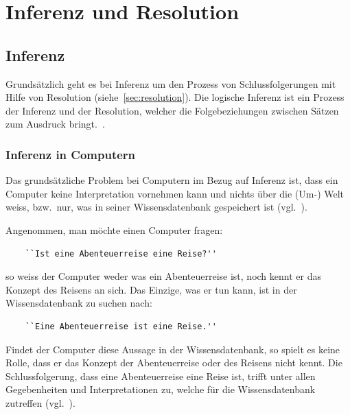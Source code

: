 \chapter{Inferenz und Resolution}
\label{chap:inferenz_resolution}

\section{Inferenz}
\label{sec:inferenz}
Grundsätzlich geht es bei Inferenz um den Prozess von Schlussfolgerungen mit Hilfe von Resolution (siehe~\ref{sec:resolution}). Die logische Inferenz ist ein Prozess der Inferenz und der Resolution, welcher die Folgebeziehungen zwischen Sätzen zum Ausdruck bringt.~\cite[S. 163]{russel}.

\subsection{Inferenz in Computern}
\label{subsec:inferenz-in-computer}

Das grundsätzliche Problem bei Computern im Bezug auf Inferenz ist, dass ein Computer keine Interpretation vornehmen kann und nichts über die (Um-) Welt weiss, bzw.\ nur, was in seiner Wissensdatenbank gespeichert ist (vgl.~\citet[S. 164]{russel}).


Angenommen, man möchte einen Computer fragen:

\begin{lstlisting}
    ``Ist eine Abenteuerreise eine Reise?''
\end{lstlisting}

so weiss der Computer weder was ein Abenteuerreise ist, noch kennt er das Konzept des Reisens an sich. Das Einzige, was er tun kann, ist in der Wissensdatenbank zu suchen nach:

\begin{lstlisting}
    ``Eine Abenteuerreise ist eine Reise.''
\end{lstlisting}

Findet der Computer diese Aussage in der Wissensdatenbank, so spielt es keine Rolle, dass er das Konzept der Abenteuerreise oder des Reisens nicht kennt. Die Schlussfolgerung, dass eine Abenteuerreise eine Reise ist, trifft unter allen Gegebenheiten und Interpretationen zu, welche für die Wissensdatenbank zutreffen (vgl.~\cite[S.164]{russel}).

